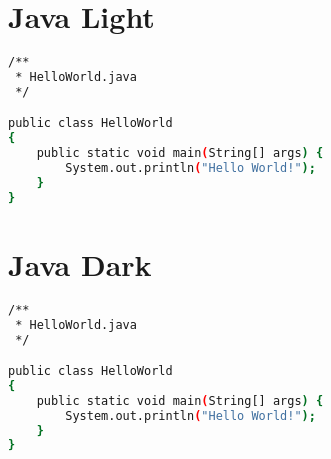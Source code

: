 \section{Java Light}

\begin{lstlisting}[language=bash, style=customStyleJavaLight, caption=Snippet title]
/**
 * HelloWorld.java
 */

public class HelloWorld
{
	public static void main(String[] args) {
		System.out.println("Hello World!");
	}
}
\end{lstlisting}

\section{Java Dark}

\begin{lstlisting}[language=bash, style=customStyleJavaDark, caption=Snippet title]
/**
 * HelloWorld.java
 */

public class HelloWorld
{
	public static void main(String[] args) {
		System.out.println("Hello World!");
	}
}
\end{lstlisting}